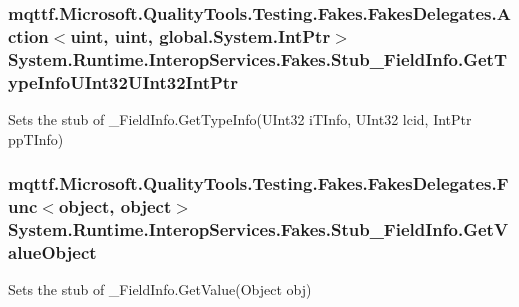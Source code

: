 \hypertarget{class_system_1_1_runtime_1_1_interop_services_1_1_fakes_1_1_stub___field_info_ae20e271b9f74a07346af544b0b171345}{
\subsubsection[{Get\-Type\-Info\-U\-Int32\-U\-Int32\-Int\-Ptr}]{\setlength{\rightskip}{0pt plus 5cm}mqttf.\-Microsoft.\-Quality\-Tools.\-Testing.\-Fakes.\-Fakes\-Delegates.\-Action$<$uint, uint, global.\-System.\-Int\-Ptr$>$ System.\-Runtime.\-Interop\-Services.\-Fakes.\-Stub\-\_\-\-Field\-Info.\-Get\-Type\-Info\-U\-Int32\-U\-Int32\-Int\-Ptr}}\label{class_system_1_1_runtime_1_1_interop_services_1_1_fakes_1_1_stub___field_info_ae20e271b9f74a07346af544b0b171345}


Sets the stub of \-\_\-\-Field\-Info.\-Get\-Type\-Info(\-U\-Int32 i\-T\-Info, U\-Int32 lcid, Int\-Ptr pp\-T\-Info)

\hypertarget{class_system_1_1_runtime_1_1_interop_services_1_1_fakes_1_1_stub___field_info_a4e884911f9397c76ee1571fc976fdc85}{
\subsubsection[{Get\-Value\-Object}]{\setlength{\rightskip}{0pt plus 5cm}mqttf.\-Microsoft.\-Quality\-Tools.\-Testing.\-Fakes.\-Fakes\-Delegates.\-Func$<$object, object$>$ System.\-Runtime.\-Interop\-Services.\-Fakes.\-Stub\-\_\-\-Field\-Info.\-Get\-Value\-Object}}\label{class_system_1_1_runtime_1_1_interop_services_1_1_fakes_1_1_stub___field_info_a4e884911f9397c76ee1571fc976fdc85}


Sets the stub of \-\_\-\-Field\-Info.\-Get\-Value(\-Object obj)

